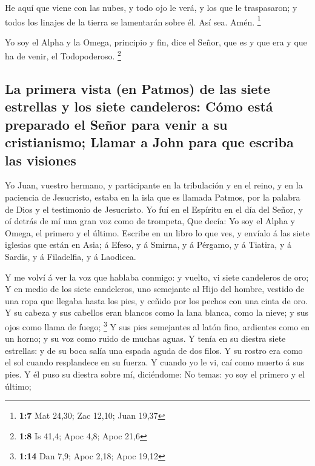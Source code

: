  He aquí que viene con las nubes, y todo ojo le verá, y los
que le traspasaron; y todos los linajes de la tierra se lamentarán sobre
él. Así sea. Amén. \footnote{\textbf{1:7} Mat 24,30; Zac 12,10; Juan
  19,37}

 Yo soy el Alpha y la Omega, principio y fin, dice el Señor,
que es y que era y que ha de venir, el Todopoderoso. \footnote{\textbf{1:8}
  Is 41,4; Apoc 4,8; Apoc 21,6}

\hypertarget{la-primera-vista-en-patmos-de-las-siete-estrellas-y-los-siete-candeleros-cuxf3mo-estuxe1-preparado-el-seuxf1or-para-venir-a-su-cristianismo-llamar-a-john-para-que-escriba-las-visiones}{%
\subsection{La primera vista (en Patmos) de las siete estrellas y los
siete candeleros: Cómo está preparado el Señor para venir a su
cristianismo; Llamar a John para que escriba las
visiones}\label{la-primera-vista-en-patmos-de-las-siete-estrellas-y-los-siete-candeleros-cuxf3mo-estuxe1-preparado-el-seuxf1or-para-venir-a-su-cristianismo-llamar-a-john-para-que-escriba-las-visiones}}

 Yo Juan, vuestro hermano, y participante en la tribulación
y en el reino, y en la paciencia de Jesucristo, estaba en la isla que es
llamada Patmos, por la palabra de Dios y el testimonio de Jesucristo.
 Yo fuí en el Espíritu en el día del Señor, y oí detrás de
mí una gran voz como de trompeta,  Que decía: Yo soy el
Alpha y Omega, el primero y el último. Escribe en un libro lo que ves, y
envíalo á las siete iglesias que están en Asia; á Efeso, y á Smirna, y á
Pérgamo, y á Tiatira, y á Sardis, y á Filadelfia, y á Laodicea.

 Y me volví á ver la voz que hablaba conmigo: y vuelto, vi
siete candeleros de oro;  Y en medio de los siete
candeleros, uno semejante al Hijo del hombre, vestido de una ropa que
llegaba hasta los pies, y ceñido por los pechos con una cinta de oro.
 Y su cabeza y sus cabellos eran blancos como la lana
blanca, como la nieve; y sus ojos como llama de fuego; \footnote{\textbf{1:14}
  Dan 7,9; Apoc 2,18; Apoc 19,12}  Y sus pies semejantes al
latón fino, ardientes como en un horno; y su voz como ruido de muchas
aguas.  Y tenía en su diestra siete estrellas: y de su boca
salía una espada aguda de dos filos. Y su rostro era como el sol cuando
resplandece en su fuerza.  Y cuando yo le vi, caí como
muerto á sus pies. Y él puso su diestra sobre mí, diciéndome: No temas:
yo soy el primero y el último;

